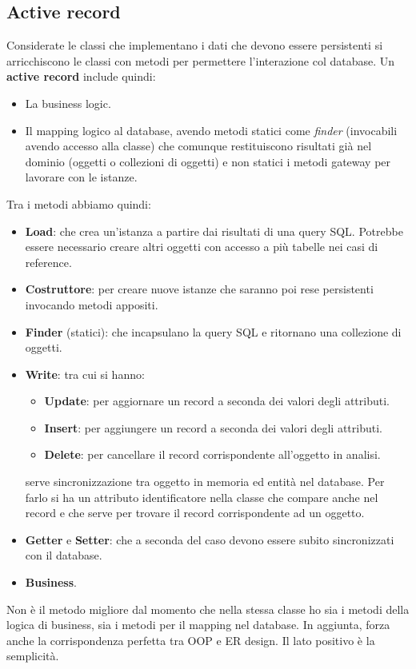 \subsection{Active record}
Considerate le classi che implementano i dati che devono essere persistenti si
arricchiscono le classi con metodi per permettere l'interazione col database. Un
\textbf{active record} include quindi:
\begin{itemize}
      \item La business logic.
      \item Il mapping logico al database, avendo  metodi statici come
            \textit{finder} (invocabili avendo accesso alla classe) che comunque
            restituiscono risultati già nel dominio (oggetti o collezioni di
            oggetti) e non statici i metodi gateway per lavorare con le istanze.
\end{itemize}
Tra i metodi abbiamo quindi:
\begin{itemize}
      \item \textbf{Load}: che crea un'istanza a partire dai risultati di una
            query SQL. Potrebbe essere necessario creare altri oggetti con
            accesso a più tabelle nei casi di reference.
      \item \textbf{Costruttore}: per creare nuove istanze che saranno poi rese
            persistenti invocando metodi appositi.
      \item \textbf{Finder} (statici): che incapsulano la query SQL e ritornano
            una collezione di oggetti.
      \item \textbf{Write}: tra cui si hanno:
            \begin{itemize}
                  \item \textbf{Update}: per aggiornare un record a seconda dei
                        valori degli attributi.
                  \item \textbf{Insert}: per aggiungere un record a seconda dei
                        valori degli attributi.
                  \item \textbf{Delete}: per cancellare il record corrispondente
                        all'oggetto in analisi.
            \end{itemize}
            serve sincronizzazione tra oggetto in memoria ed entità nel database.
            Per farlo si ha un attributo identificatore nella classe che compare
            anche nel record e che serve per trovare il record corrispondente ad
            un oggetto.
      \item \textbf{Getter} e \textbf{Setter}: che a seconda del caso devono
            essere subito sincronizzati con il database.
      \item \textbf{Business}.
\end{itemize}
Non è il metodo migliore dal momento che nella stessa classe ho sia i metodi
della logica di business, sia i metodi per il mapping nel database. In aggiunta,
forza anche la corrispondenza perfetta tra OOP e ER design. Il lato positivo è
la semplicità.
